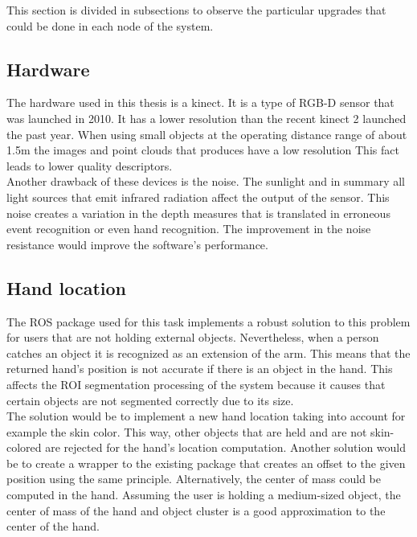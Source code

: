 	This section is divided in subsections to observe the particular upgrades that could be done in each node of the system. 

	\subsection{Hardware}

	The hardware used in this thesis is a kinect. 
	It is a type of RGB-D sensor that was launched in 2010. 
	It has a lower resolution than the recent kinect 2 launched the past year. 
	When using small objects at the operating distance range of about 1.5m the images and point clouds that produces have a low resolution 
	This fact leads to lower quality descriptors.
	\\

	Another drawback of these devices is the noise. 
	The sunlight and in summary all light sources that emit infrared radiation affect the output of the sensor. 
	This noise creates a variation in the depth measures that is translated in erroneous event recognition or even hand recognition. 
	The improvement in the noise resistance would improve the software's performance. 


	\subsection{Hand location}

	The ROS package used for this task implements a robust solution to this problem for users that are not holding external objects. 
	Nevertheless, when a person catches an object it is recognized as an extension of the arm.  
	This means that the returned hand's position is not accurate if there is an object in the hand. 
	This affects the ROI segmentation processing of the system because it causes that certain objects are not segmented correctly due to its size.  
	\\

	The solution would be to implement a new hand location taking into account for example the skin color. 
	This way, other objects that are held and are not skin-colored are rejected for the hand's location computation. 
	Another solution would be to create a wrapper to the existing package that creates an offset to the given position using the same principle. 
	Alternatively, the center of mass could be computed in the hand. 
	Assuming the user is holding a medium-sized object, the center of mass of the hand and object cluster is a good approximation to the center of the hand. 
	\\
	
